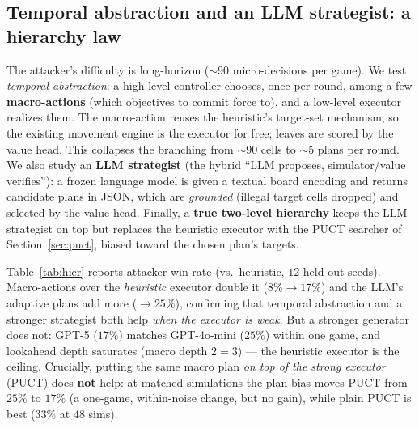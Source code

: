 \documentclass{article}
\begin{document}
\subsection{Temporal abstraction and an LLM strategist: a hierarchy law}
\label{sec:hier}
The attacker's difficulty is long-horizon ($\sim$90 micro-decisions per game). We test
\emph{temporal abstraction}: a high-level controller chooses, once per round, among a few
\textbf{macro-actions} (which objectives to commit force to), and a low-level executor
realizes them. The macro-action reuses the heuristic's target-set mechanism, so the
existing movement engine is the executor for free; leaves are scored by the value head.
This collapses the branching from $\sim$90 cells to $\sim$5 plans per round. We also study
an \textbf{LLM strategist} (the hybrid ``LLM proposes, simulator/value verifies''): a
frozen language model is given a textual board encoding and returns candidate plans in
JSON, which are \emph{grounded} (illegal target cells dropped) and selected by the value
head. Finally, a \textbf{true two-level hierarchy} keeps the LLM strategist on top but
replaces the heuristic executor with the PUCT searcher of Section~\ref{sec:puct}, biased
toward the chosen plan's targets.

Table~\ref{tab:hier} reports attacker win rate (vs.\ heuristic, $12$ held-out seeds).
Macro-actions over the \emph{heuristic} executor double it ($8\%\!\to\!17\%$) and the LLM's
adaptive plans add more ($\to25\%$), confirming that temporal abstraction and a stronger
strategist both help \emph{when the executor is weak}. But a stronger generator does not:
GPT-5 ($17\%$) matches GPT-4o-mini ($25\%$) within one game, and lookahead depth saturates
(macro depth $2{=}3$) --- the heuristic executor is the ceiling. Crucially, putting the
same macro plan \emph{on top of the strong executor} (PUCT) does \textbf{not} help: at
matched simulations the plan bias moves PUCT from $25\%$ to $17\%$ (a one-game,
within-noise change, but no gain), while plain PUCT is best ($33\%$ at $48$ sims).
\end{document}
